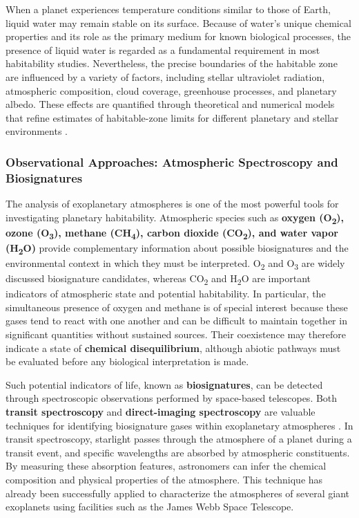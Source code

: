 When a planet experiences temperature conditions similar to those of Earth, liquid water may remain stable on its surface. Because of water's unique chemical properties and its role as the primary medium for known biological processes, the presence of liquid water is regarded as a fundamental requirement in most habitability studies. Nevertheless, the precise boundaries of the habitable zone are influenced by a variety of factors, including stellar ultraviolet radiation, atmospheric composition, cloud coverage, greenhouse processes, and planetary albedo. These effects are quantified through theoretical and numerical models that refine estimates of habitable-zone limits for different planetary and stellar environments \cite{seager2013}.

\subsubsection{Observational Approaches: Atmospheric Spectroscopy and Biosignatures}

The analysis of exoplanetary atmospheres is one of the most powerful tools for investigating planetary habitability. Atmospheric species such as \textbf{oxygen (O\textsubscript{2}), ozone (O\textsubscript{3}), methane (CH\textsubscript{4}), carbon dioxide (CO\textsubscript{2}), and water vapor (H\textsubscript{2}O)} provide complementary information about possible biosignatures and the environmental context in which they must be interpreted. O\textsubscript{2} and O\textsubscript{3} are widely discussed biosignature candidates, whereas CO\textsubscript{2} and H\textsubscript{2}O are important indicators of atmospheric state and potential habitability. In particular, the simultaneous presence of oxygen and methane is of special interest because these gases tend to react with one another and can be difficult to maintain together in significant quantities without sustained sources. Their coexistence may therefore indicate a state of \textbf{chemical disequilibrium}, although abiotic pathways must be evaluated before any biological interpretation is made.

Such potential indicators of life, known as \textbf{biosignatures}, can be detected through spectroscopic observations performed by space-based telescopes. Both \textbf{transit spectroscopy} and \textbf{direct-imaging spectroscopy} are valuable techniques for identifying biosignature gases within exoplanetary atmospheres \cite{robinson2018,quanz2022}. In transit spectroscopy, starlight passes through the atmosphere of a planet during a transit event, and specific wavelengths are absorbed by atmospheric constituents. By measuring these absorption features, astronomers can infer the chemical composition and physical properties of the atmosphere. This technique has already been successfully applied to characterize the atmospheres of several giant exoplanets using facilities such as the James Webb Space Telescope.

